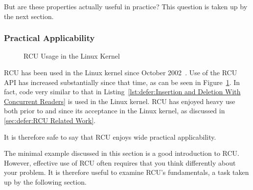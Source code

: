 But are these properties actually useful in practice?
This question is taken up by the next section.

\subsubsection{Practical Applicability}
\label{sec:defer:Practical Applicability}

\begin{figure}[tb]
\centering
{}
\caption{RCU Usage in the Linux Kernel}
\label{fig:defer:RCU Usage in the Linux Kernel}
\end{figure}

RCU has been used in the Linux kernel since
October 2002~\cite{Torvalds2.5.43}.
Use of the RCU API has increased substantially since that time,
as can be seen in
Figure~\ref{fig:defer:RCU Usage in the Linux Kernel}.
In fact, code very similar to that in
Listing~\ref{lst:defer:Insertion and Deletion With Concurrent Readers}
is used in the Linux kernel.
RCU has enjoyed heavy use both prior to and since its acceptance
in the Linux kernel, as discussed in
\cref{sec:defer:RCU Related Work}.

It is therefore safe to say that RCU enjoys wide practical applicability.

The minimal example discussed in this section is a good introduction to RCU\@.
However, effective use of RCU often requires that you think differently
about your problem.
It is therefore useful to examine RCU's fundamentals, a task taken up
by the following section.
